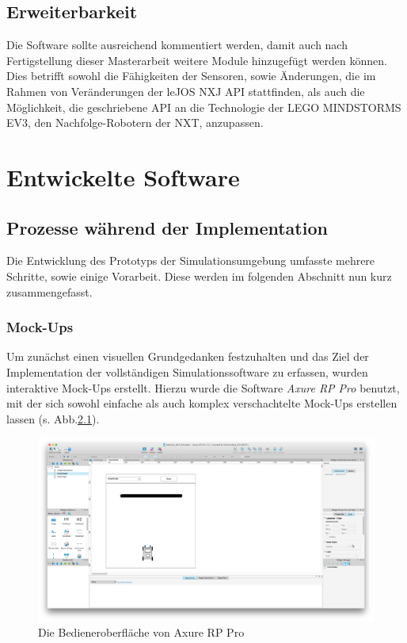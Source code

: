 \documentclass[paper=a4, pagesize, DIV=calc, BCOR=12.5mm, twoside=on, onecolumn=on, open = any, titlepage =on, parskip =half-, headsepline = on, footsepline = on, chapterprefix = on, appendixprefix = off, fontsize = 12pt, numbers = noenddot, abstract = on]{scrbook}
\numberwithin{equation}{chapter}
\theoremstyle{definition}
\theoremstyle{plain}
\theoremstyle{plain}
\theoremstyle{remark}
\theoremstyle{plain}
\theoremstyle{plain}
\begin{document}
\par \singlespacing
\section{Erweiterbarkeit} \label{sec:erweiterbarkeit}
\onehalfspacing
Die Software sollte ausreichend kommentiert werden, damit auch nach Fertigstellung dieser Masterarbeit weitere Module hinzugefügt werden können. Dies betrifft sowohl die Fähigkeiten der Sensoren, sowie Änderungen, die im Rahmen von Veränderungen der leJOS NXJ API stattfinden, als auch die Möglichkeit, die geschriebene API an die Technologie der LEGO MINDSTORMS EV3, den Nachfolge-Robotern der NXT, anzupassen.
\newpage
\newpage

\par \singlespacing
\chapter{Entwickelte Software}
\onehalfspacing
\par \singlespacing
\section{Prozesse während der Implementation}
\onehalfspacing
Die Entwicklung des Prototyps der Simulationsumgebung umfasste mehrere Schritte, sowie einige Vorarbeit. Diese werden im folgenden Abschnitt nun kurz zusammengefasst.
\par \singlespacing
\subsection{Mock-Ups} 
\onehalfspacing
Um zunächst einen visuellen Grundgedanken festzuhalten und das Ziel der Implementation der vollständigen Simulationssoftware zu erfassen, wurden interaktive Mock-Ups erstellt. Hierzu wurde die Software \emph{Axure RP Pro} benutzt, mit der sich sowohl einfache als auch komplex verschachtelte Mock-Ups erstellen lassen (s. Abb.\ref{fig:axure}).

\begin{figure}[htbp]
\centering
\includegraphics[scale=0.2]{images/axure_mockup.png} 
\caption{Die Bedieneroberfläche von Axure RP Pro}
\label{fig:axure}
\end{figure}
\end{document}
